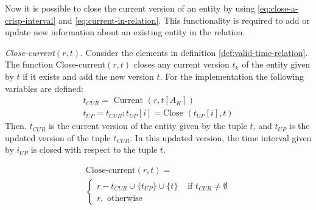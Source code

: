 Now it is possible to close the current version of an entity by using \eqref{eq:close-a-crisp-interval} and \eqref{eq:current-in-relation}. This functionality is required to add or update new information about an existing entity in the relation.

\begin{definition}
\label{def:close-current-version}
\emph{Close-current$\left(r, t\right)$}.
Consider the elements in definition \ref{def:valid-time-relation}. The function Close-current$\left(r, t \right)$ closes any current version $t_k$ of the entity given by $t$ if it exists and add the new version $t$. For the implementation the following variables are defined:
\begin{align}
 \label{eq:variables-current-version}
t_{CUR} = \mbox{ Current } \left(r, t[A_K] \right)\\
\nonumber
t_{UP} = t_{CUR}; t_{UP}\left[i \right] = \mbox{Close }\left(t_{UP}\left[i \right], t \right)
\nonumber
\end{align}
Then, $t_{CUR}$ is the current version of the entity given by the tuple $t$, and $t_{UP}$ is the updated version of the tuple $t_{CUR}$. In this updated version, the time interval given by $i_{UP}$ is closed with respect to the tuple $t$.


\begin{eqnarray}
\label{eq:close-current}
\text{Close-current} \left(r, t \right) =\\
\begin{cases}
\nonumber
r - t_{CUR} \cup \lbrace t_{UP}\rbrace \cup \lbrace t \rbrace
& \mbox{ if } t_{CUR} \neq \emptyset \\
\nonumber r , \text{ otherwise}
\end{cases}
\end{eqnarray}
\end{definition}

